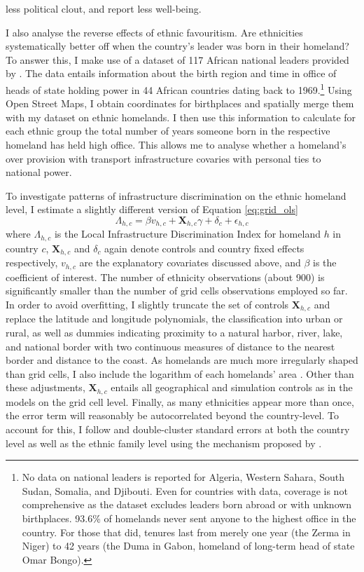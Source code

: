 \documentclass[11pt, oneside]{article}   	%
\begin{document}
less political clout, and report less well-being.

I also analyse the reverse effects of ethnic favouritism. Are ethnicities systematically better off when the country's leader was born in their homeland? To answer this, I make use of a dataset of 117 African national leaders provided by \cite{Dreher_AiddemandAfrican_2016}. The data entails information about the birth region and time in office of heads of state holding power in 44 African countries dating back to 1969.\footnote{No data on national leaders is reported for Algeria, Western Sahara, South Sudan, Somalia, and Djibouti. Even for countries with data, coverage is not comprehensive as the dataset excludes leaders born abroad or with unknown birthplaces. 93.6\% of homelands never sent anyone to the highest office in the country. For those that did, tenures last from merely one year (the Zerma in Niger) to 42 years (the Duma in Gabon, homeland of long-term head of state Omar Bongo).} Using Open Street Maps, I obtain coordinates for birthplaces and spatially merge them with my dataset on ethnic homelands. I then use this information to calculate for each ethnic group the total number of years someone born in the respective homeland has held high office. This allows me to analyse whether a homeland's over provision with transport infrastructure covaries with personal ties to national power.

To investigate patterns of infrastructure discrimination on the ethnic homeland level, I estimate a slightly different version of Equation \eqref{eq:grid_ols}
\begin{equation}
  \Lambda_{h,c} = \beta v_{h,c} + \textbf{X}_{h,c}\gamma + \delta_{c} + \epsilon_{h,c}
  \label{eq:ethn_ols}
\end{equation}
where $\Lambda_{h,c}$ is the Local Infrastructure Discrimination Index for homeland $h$ in country $c$, $\textbf{X}_{h,c}$ and $\delta_{c}$ again denote controls and country fixed effects respectively, $v_{h,c}$ are the explanatory covariates discussed above, and $\beta$ is the coefficient of interest. The number of ethnicity observations (about 900) is significantly smaller than the number of grid cells observations employed so far. In order to avoid overfitting, I slightly truncate the set of controls $\textbf{X}_{h,c}$ and replace the latitude and longitude polynomials, the classification into urban or rural, as well as dummies indicating proximity to a natural harbor, river, lake, and national border with two continuous measures of distance to the nearest border and distance to the coast. As homelands are much more irregularly shaped than grid cells, I also include the logarithm of each homelands' area \citep{michalopoulos_long-run_2016}. Other than these adjustments, $\textbf{X}_{h,c}$ entails all geographical and simulation controls as in the models on the grid cell level. Finally, as many ethnicities appear more than once, the error term will reasonably be autocorrelated beyond the country-level. To account for this, I follow \cite{michalopoulos_long-run_2016} and double-cluster standard errors at both the country level as well as the ethnic family level using the mechanism proposed by \cite{Cameron_RobustInferenceMultiway_2011}.
\end{document}
